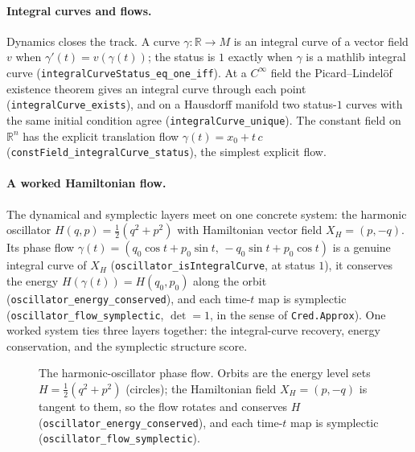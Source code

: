 \documentclass[11pt,a4paper]{article}
\newcommand{\Lean}[1]{\texttt{#1}}
\begin{document}
\paragraph{Integral curves and flows.}
Dynamics closes the track.  A curve $\gamma:\mathbb R\to M$ is an
integral curve of a vector field $v$ when $\gamma'(t)=v(\gamma(t))$; the
status is $1$ exactly when $\gamma$ is a mathlib integral curve
(\Lean{integralCurveStatus\_eq\_one\_iff}).  At a $C^\infty$ field the
Picard--Lindel\"of existence theorem gives an integral curve through each
point (\Lean{integralCurve\_exists}), and on a Hausdorff manifold two
status-$1$ curves with the same initial condition agree
(\Lean{integralCurve\_unique}).  The constant field on $\mathbb R^n$ has
the explicit translation flow $\gamma(t)=x_0+t\,c$
(\Lean{constField\_integralCurve\_status}), the simplest explicit flow.

\paragraph{A worked Hamiltonian flow.}
The dynamical and symplectic layers meet on one concrete system: the
harmonic oscillator $H(q,p)=\tfrac12(q^2+p^2)$ with Hamiltonian vector
field $X_H=(p,-q)$.  Its phase flow
$\gamma(t)=(q_0\cos t+p_0\sin t,\,-q_0\sin t+p_0\cos t)$ is a genuine
integral curve of $X_H$ (\Lean{oscillator\_isIntegralCurve}, at status
$1$), it conserves the energy $H(\gamma(t))=H(q_0,p_0)$ along the orbit
(\Lean{oscillator\_energy\_conserved}), and each time-$t$ map is
symplectic (\Lean{oscillator\_flow\_symplectic}, $\det=1$, in the sense
of \texttt{Cred.Approx}).  One worked system ties three layers together:
the integral-curve recovery, energy conservation, and the symplectic
structure score.

\begin{figure}[h]
\centering
{}
\caption{The harmonic-oscillator phase flow.  Orbits are the energy level
sets $H=\tfrac12(q^2+p^2)$ (circles); the Hamiltonian field $X_H=(p,-q)$
is tangent to them, so the flow rotates and conserves $H$
(\Lean{oscillator\_energy\_conserved}), and each time-$t$ map is
symplectic (\Lean{oscillator\_flow\_symplectic}).}
\label{fig:hamiltonian-flow}
\end{figure}
\end{document}
